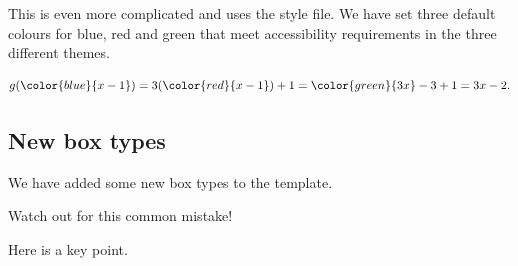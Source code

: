 \documentclass[
]{article}
\numberwithin{equation}{section}
\numberwithin{figure}{section}
\theoremstyle{break}
\theoremstyle{definition}
\theoremstyle{definition}
\theoremstyle{definition}
\theoremstyle{definition}
\theoremstyle{remark}
\begin{document}
This is even more complicated and uses the style file. We have set three default colours for blue, red and green that meet accessibility requirements in the three different themes.

\[
g(\color{blue}{x-1}) = 3(\color{red}{x-1}) + 1 = \color{green}{3x} - 3 + 1 = 3x-2.
\]

\hypertarget{new-box-types}{%
\subsection{New box types}\label{new-box-types}}

We have added some new box types to the template.

Watch out for this common mistake!

Here is a key point.

  
\end{document}
